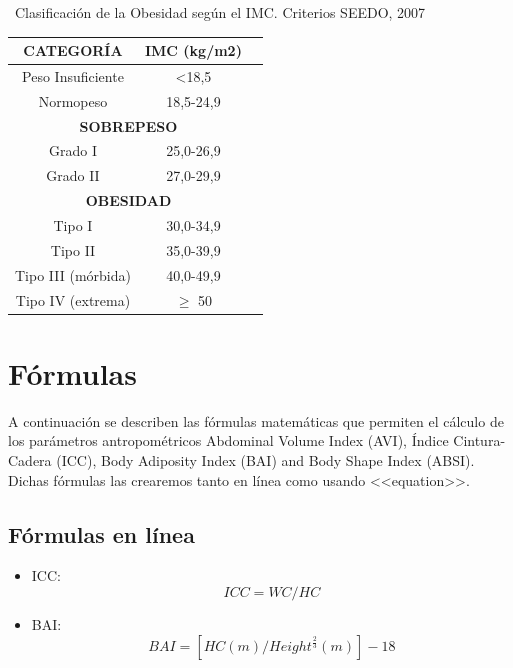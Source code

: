 \documentclass[a4paper,11pt]{article}
\begin{document}
\begin{center}
	\ Clasificación de la Obesidad según el IMC. Criterios SEEDO, 2007\
\end{center}
		
\begin{table}[H]
	\begin{center}
	\begin{tabular}{|c|c|c}
		\hline
		\rowcolor[HTML]{C0C0C0} 
		{\color[HTML]{333333} \textbf{CATEGORÍA}} & {\color[HTML]{333333} \textbf{IMC (kg/m2})} \\ \hline
		Peso Insuficiente                & \textless 18,5                    \\ \hline
		Normopeso                        & 18,5-24,9                         \\ \hline
		\multicolumn{2}{|c|}{\textbf{SOBREPESO}}                                      \\ \hline
		Grado I                          & 25,0-26,9                         \\ \hline
		Grado II                         & 27,0-29,9                         \\ \hline
		\multicolumn{2}{|c|}{\textbf{OBESIDAD}}                                       \\ \hline
		Tipo I                           & 30,0-34,9                         \\ \hline
		Tipo II                          & 35,0-39,9                         \\ \hline
		Tipo III (mórbida)               & 40,0-49,9                         \\ \hline
		Tipo IV (extrema)                & $\geq$ 50                       \\ \hline
	\end{tabular}
	\end{center}
	\end{table}
		
\section{Fórmulas}
A continuación se describen las fórmulas matemáticas que permiten el cálculo de los parámetros antropométricos Abdominal Volume Index (AVI), Índice Cintura-Cadera (ICC), Body Adiposity Index (BAI) and Body Shape Index (ABSI). Dichas fórmulas las crearemos tanto en línea como usando <<equation>>.
		
\subsection{Fórmulas en línea}
\begin{itemize}
	\item ICC: $$ICC= WC/HC$$
	\item BAI: $$BAI = [HC(m)/Height^{\frac{2}{3}}(m)]-18$$
			
\end{itemize}
	
\end{document}
